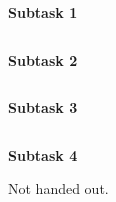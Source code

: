 \textbf{Subtask 1}

\inputminted{csharp}{\context/answer/NondestructiveSet.cs}

\textbf{Subtask 2}

\inputminted{csharp}{\context/answer/NondestructiveHashSet.cs}

\textbf{Subtask 3}

\inputminted{csharp}{\context/answer/NondestructiveHashSetTest.cs}

\textbf{Subtask 4}

Not handed out.
